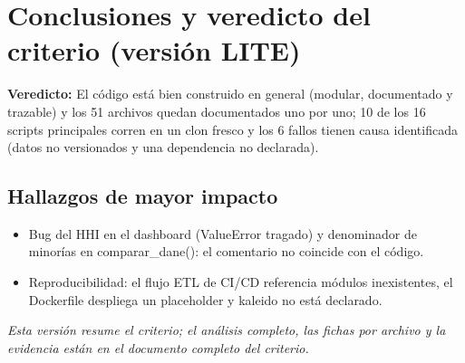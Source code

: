 \section{Conclusiones y veredicto del criterio (versión LITE)}

\begin{tcolorbox}[hallazgo]
\textbf{Veredicto:} El código está bien construido en general (modular, documentado y trazable) y los 51 archivos quedan documentados uno por uno; 10 de los 16 scripts principales corren en un clon fresco y los 6 fallos tienen causa identificada (datos no versionados y una dependencia no declarada).

\end{tcolorbox}

\subsection{Hallazgos de mayor impacto}

\begin{itemize}
  \item Bug del HHI en el dashboard (ValueError tragado) y denominador de minorías en comparar\_dane(): el comentario no coincide con el código.
  \item Reproducibilidad: el flujo ETL de CI/CD referencia módulos inexistentes, el Dockerfile despliega un placeholder y kaleido no está declarado.
\end{itemize}

\noindent\textit{Esta versión resume el criterio; el análisis completo, las
fichas por archivo y la evidencia están en el documento completo del criterio.}
